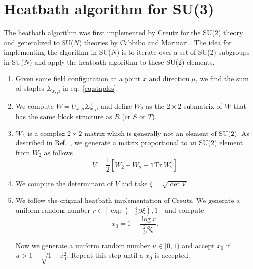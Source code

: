 \documentclass[12pt,a4paper]{article}
\begin{document}
\newpage
\section*{Heatbath algorithm for SU(3)}
The heatbath algorithm was first implemented by Creutz for the SU(2) theory \cite{creutz1980} and generalized to SU($N$) theories by Cabbibo and Marinari \cite{cabbibo1982}. The idea for implementing the algorithm in SU($N$) is to iterate over a set of SU(2) subgroups in SU($N$) and apply the heatbath algorithm to these SU(2) elements. 

\begin{enumerate}
	\item Given some field configuration at a point $x$ and direction $\mu$, we find the sum of staples $\Sigma_{x,\mu}$ in eq.\ \eqref{eq:staples}.
	
	\item We compute $W = U_{x,\mu} \Sigma_{x,\mu}^{\dagger}$ and define $W_2$ as the $2\times 2$ submatrix of $W$ that has the same block structure as $R$ (or $S$ or $T$).
	
	\item $W_2$ is a complex $2\times 2$ matrix which is generally not an element of SU(2). As described in Ref.\ \cite{kennedy1985}, we generate a matrix proportional to an SU(2) element from $W_2$ as follows
	\begin{equation}
	V = \frac{1}{2} \left[ W_2 - W_2^{\dagger} + \mathds{1}\text{Tr}\ W_2^{\dagger}\right]
	\end{equation}
	\item We compute the determinant of $V$ and take $\xi = \sqrt{\det V}$
	
	\item We follow the original heatbath implementation of Creutz. We generate a uniform random number $r \in [\exp(-\frac{4}{3}\beta \xi),1]$ and compute
	\begin{equation}
		x_0 = 1 + \frac{\log r}{\frac{2}{3}\beta \xi}.
	\end{equation}		
	
	Now we generate a uniform random number $u\in [0,1)$ and accept $x_0$ if $ u > 1 - \sqrt{1-x_0^2}$. Repeat this step until a $x_0$ is accepted.
	

\end{enumerate}
\end{document}
